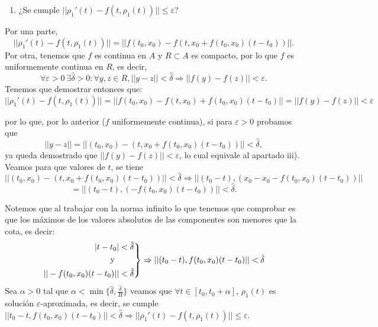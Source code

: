 \documentclass[11pt]{article}
\makeatletter
\theoremstyle{theorem-style}  %
\renewenvironment{proof}[1][\proofname]{\par
	\pushQED{\qed}%
	\normalfont \topsep6\p@\@plus6\p@\relax
	\list{}{%
		\settowidth{\leftmargin}{\quad:\hskip\labelsep}%
		\setlength{\labelwidth}{0pt}%
		\setlength{\itemindent}{-\leftmargin}%
	}%
	\item[\hskip\labelsep\itshape#1\@addpunct{:}]\ignorespaces
}{%
	\popQED\endlist\@endpefalse
}
\theoremstyle{definition-style}
\theoremstyle{example-style}
\newenvironment{rcases}
{\left.\begin{aligned}}
	{\end{aligned}\right\rbrace}
\makeatother
\begin{document}
\begin{proof}
\begin{enumerate}[\qquad i)]
		\item ¿Se cumple $ ||\rho_1'(t)-f(t,\rho_1(t))||\leq \varepsilon $?
	\end{enumerate}
	
	Por una parte,  \[||\rho_1'(t)-f(t,\rho_1(t))||=||f(t_0,x_0)-f(t,x_0+f(t_0,x_0)(t-t_0))|| .\]
	Por otra, tenemos que $f$ es continua en $A$ y $R\subset A$ es compacto, por lo que $f$ es uniformemente continua en $R$, es decir, 
	\[\forall \varepsilon > 0 \ \exists \hat{\delta} >0 : \forall y,z \in R, ||y-z||<\hat{\delta} \Rightarrow||f(y)-f(z)||<\varepsilon .\]
	Tenemos que demostrar entonces que:  \[||\rho_1'(t)-f(t,\rho_1(t))||=||f(t_0,x_0)-f(t,x_0)+f(t_0,x_0)(t-t_0)||=||f(y)-f(z)||<\varepsilon \]
	
	por lo que, por lo anterior ($ f $ uniformemente continua), si para $ \varepsilon>0 $ probamos que 
	\[||y-z||=||(t_0,x_0)-(t, x_0+f(t_0,x_0)(t-t_0))||< \hat{\delta}, \]
	ya queda demostrado que $ ||f(y)-f(z)||<\varepsilon $, lo cual equivale al apartado iii). Veamos para que valores de $ t $, se tiene 
	\[||(t_0,x_0)-(t, x_0+f(t_0,x_0)(t-t_0))||< \hat{\delta} \Rightarrow ||(t_0-t),( x_0-x_0 -f(t_0,x_0)(t-t_0))||\]
	\[=||(t_0-t),(-f(t_0,x_0)(t-t_0))||< \hat{\delta} .\]
	
	Notemos que al trabajar con la norma infinito lo que tenemos que comprobar es que los máximos de los valores absolutos de las componentes son menores que la cota, es decir:	
	\[ \begin{rcases}
	 |t-t_0|< \hat{\delta}\\
	 \text{ y }\qquad\\
	|| -f(t_0,x_0)(t-t_0)||< \hat{\delta}
	\end{rcases} \Rightarrow ||(t_0-t), f(t_0,x_0)(t-t_0)||< \hat{\delta} \]
	Sea $ \alpha >0 $ tal que $ \alpha < \min \{ \hat{\delta}, \frac{\hat{\delta}}{H}\} $ veamos que $ \forall t \in [t_0,t_0+\alpha] $, $\rho_1(t)$ es solución $ \varepsilon $-aproximada, es decir, se cumple $ ||t_0-t,f(t_0,x_0)(t-t_0)||< \hat{\delta}\Rightarrow ||\rho_1'(t)-f(t,\rho_1(t))||\leq \varepsilon $.
	

\end{proof}
\end{document}
